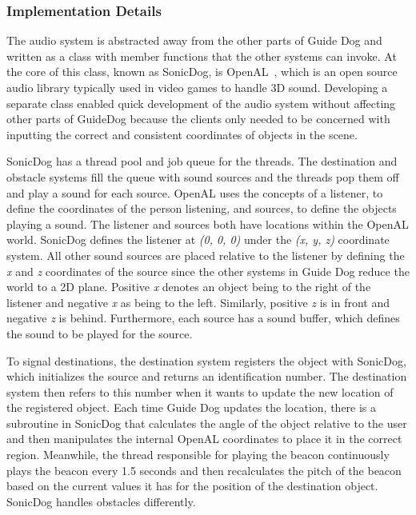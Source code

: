 \subsubsection{Implementation Details}
\label{sec:technical-audio-impl}

The audio system is abstracted away from the other parts of Guide Dog and
written as a class with member functions that the other systems can invoke. At 
the core of this class, known as SonicDog, is OpenAL~\cite{openal-website}, which
is an open source audio library typically used in video games to handle 3D
sound. Developing a separate class enabled quick development of the audio system
without affecting other parts of GuideDog because the clients only needed to be
concerned with inputting the correct and consistent coordinates of objects in 
the scene.

SonicDog has a thread pool and job queue for the threads. The destination
and obstacle systems fill the queue with sound sources and the threads pop them 
off and play a sound for each source. OpenAL uses the concepts of a listener, to 
define the coordinates of the person listening, and sources, to define the 
objects playing a sound. The listener and sources both have locations within the 
OpenAL world. SonicDog defines the listener at \emph{(0, 0, 0)} under the 
\emph{(x, y, z)} coordinate system. All other sound sources are placed relative 
to the listener by defining the \emph{x} and \emph{z} coordinates of the source 
since the other systems in Guide Dog reduce the world to a 2D plane. Positive 
\emph{x} denotes an object being to the right of the listener and negative 
\emph{x} as being to the left. Similarly, positive \emph{z} is in front and 
negative \emph{z} is behind. Furthermore, each source has a sound buffer, which 
defines the sound to be played for the source.

To signal destinations, the destination system registers the object with
SonicDog, which initializes the source and returns an identification number. 
The destination system then refers to this number when it wants to update the
new location of the registered object. Each time Guide Dog updates the location,
there is a subroutine in SonicDog that calculates the angle of the object 
relative to the user and then manipulates the internal OpenAL coordinates to 
place it in the correct region. Meanwhile, the thread responsible for playing 
the beacon continuously plays the beacon every 1.5 seconds and then 
recalculates the pitch of the beacon based on the current values it has for the 
position of the destination object. SonicDog handles obstacles differently.

